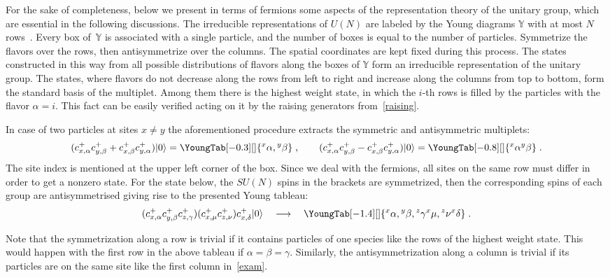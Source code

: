 \documentclass[11pt]{article}
\newcommand{\yn}{\mathbb{Y}}
\begin{document}
For the sake of completeness,  below we present in terms of fermions  some aspects
of the representation theory  of the unitary group, which are essential in
the following discussions.
The irreducible representations of $U(N)$
are labeled by the Young diagrams $\yn$ with at most $N$ rows~\cite{Hamermesh}.
Every box of~$\yn$ is associated with a single particle,
and the number of boxes is equal to  the number of particles.
Symmetrize the f\/lavors over the rows, then antisymmetrize over the columns. The spatial coordinates
are kept f\/ixed during this process.
The states constructed in this way from all possible distributions of  f\/lavors along the
boxes of $\yn$  form an irreducible representation of the unitary group.
The states, where f\/lavors do not decrease along the rows from left to right
and increase along the columns from top to bottom, form the standard basis of the multiplet.
Among them there is the highest weight state, in which the $i$-th rows is f\/illed
by the particles with the f\/lavor $\alpha=i$. This fact can be easily verif\/ied acting
on it by the raising generators from~\eqref{raising}.

In case of two particles at sites $x\ne y$ the aforementioned procedure
extracts the symmetric and antisymmetric multiplets:
%
\def\YGbox{15}    %
\def\YGrule{0.4}   %
\[
(c^+_{x,\alpha}c^+_{y,\beta}+c^+_{x,\beta}c^+_{y,\alpha})|0\rangle
=
\YoungTab[-0.3][\normalsize]{ {{}^x\alpha,{}^y\beta} }
\;,
\qquad
(c^+_{x,\alpha}c^+_{y,\beta}-c^+_{x,\beta}c^+_{y,\alpha})|0\rangle
=
\YoungTab[-0.8][\normalsize]{ {{}^x\alpha}{{}^y\beta} }\;.
\]
The site index is mentioned at the upper left corner of the box.
Since we deal with the fermions, all sites on the same row must dif\/fer in order to
get a nonzero state.
For the state below, the $SU(N)$ spins in the brackets are symmetrized, then the corresponding spins
of each group are antisymmetrised giving rise to the presented Young tableau:
\begin{equation}
\label{exam}
(c^+_{x,\alpha}c^+_{y,\beta}c^+_{z,\gamma})(c^+_{x,\mu}c^+_{z,\nu})c^+_{x,\delta}|0\rangle
\quad\longrightarrow\quad
\YoungTab[-1.4][\normalsize]{ {{}^x\alpha,{}^y\beta,{}^z\gamma} {{}^x\mu,{}^z\nu } {{}^x\delta }}\;.
\end{equation}

Note that the symmetrization along a row is trivial if it contains particles of one species
like the rows of the highest weight state.
This would happen with the f\/irst row in the above tableau if $\alpha=\beta=\gamma$.
Similarly, the antisymmetrization along a column is trivial if its particles are on the same site like
the f\/irst column in~\eqref{exam}.
\end{document}
